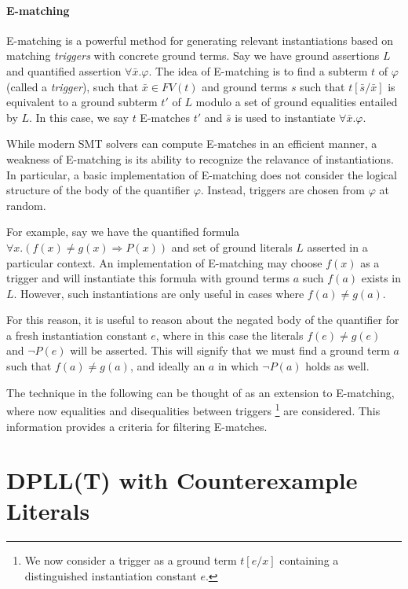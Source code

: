 \documentclass{llncs}
\begin{document}
\paragraph{E-matching}
E-matching is a powerful method for generating relevant instantiations based on matching \emph{triggers} with concrete ground terms. 
Say we have ground assertions $L$ and quantified assertion $\forall \bar{x}. \varphi$.
The idea of E-matching is to find a subterm $t$ of $\varphi$ (called a \emph{trigger}), such that $\bar{x} \in FV( t )$ and ground terms $s$ such that $t[\bar{s}/\bar{x}]$ is equivalent to a ground subterm $t'$ of $L$ modulo a set of ground equalities entailed by $L$.
In this case, we say $t$ E-matches $t'$ and $\bar{s}$ is used to instantiate $\forall \bar{x}. \varphi$.

While modern SMT solvers can compute E-matches in an efficient manner, a weakness of E-matching is its ability to recognize the relavance of instantiations.
In particular, a basic implementation of E-matching does not consider the logical structure of the body of the quantifier $\varphi$.
Instead, triggers are chosen from $\varphi$ at random.

For example, say we have the quantified formula $\forall x. ( f(x) \neq g(x) \Rightarrow P( x ) )$ and set of ground literals $L$ asserted in a particular context. 
An implementation of E-matching may choose $f( x )$ as a trigger and will instantiate this formula with ground terms $a$ such $f( a )$ exists in $L$.
However, such instantiations are only useful in cases where $f( a ) \neq g( a )$.

For this reason, it is useful to reason about the negated body of the quantifier for a fresh instantiation constant $e$, where in this case the literals $f( e ) \neq g( e )$ and $\neg P( e )$ will be asserted.
This will signify that we must find a ground term $a$ such that $f( a ) \neq g( a )$, and ideally an $a$ in which $\neg P( a )$ holds as well.

The technique in the following can be thought of as an extension to E-matching, where now equalities and disequalities between triggers \footnote{We now consider a trigger as a ground term $t[e/x]$ containing a distinguished instantiation constant $e$. }
 are considered.
This information provides a criteria for filtering E-matches.

\section{DPLL(T) with Counterexample Literals}
\label{dpll-ce-lit}
\end{document}
